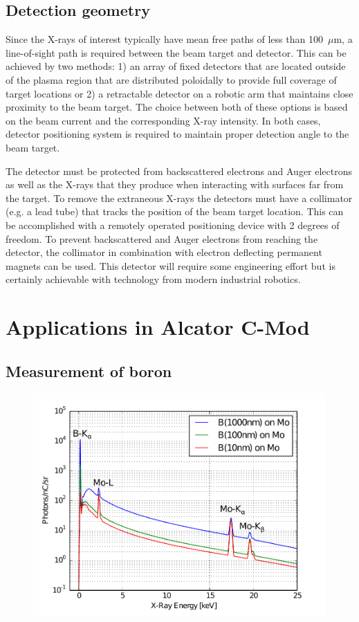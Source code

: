 \documentclass[12pt,letterpaper,final]{article}
\begin{document}
\subsection{Detection geometry}
\label{sec:DetectionGeometry}

Since the X-rays of interest typically have mean free paths of less than 100~$\mu$m, a line-of-sight path is required between the beam target and detector.  This can be achieved by two methods: 1) an array of fixed detectors that are located outside of the plasma region that are distributed poloidally to provide full coverage of target locations or 2) a retractable detector on a robotic arm that maintains close proximity to the beam target. The choice between both of these options is based on the beam current and the corresponding X-ray intensity. In both cases, detector positioning system is required to maintain proper detection angle to the beam target.
 
The detector must be protected from backscattered electrons and Auger electrons as well as the X-rays that they produce when interacting with surfaces far from the target. To remove the extraneous X-rays the detectors must have a collimator (e.g. a lead tube) that tracks the position of the beam target location. This can be accomplished with a remotely operated positioning device with 2 degrees of freedom. To prevent backscattered and Auger electrons from reaching the detector, the collimator in combination with electron deflecting permanent magnets can be used. This detector will require some engineering effort but is certainly achievable with technology from modern industrial robotics.

\section{Applications in Alcator C-Mod}

\subsection{Measurement of boron}

\begin{figure}[!h]
 \centering
  \includegraphics[width=\columnwidth]{figures/BoronOnMoSpectra.pdf}
 \caption{}
 \label{fig:BoronSpectra}
\end{figure}
\end{document}
